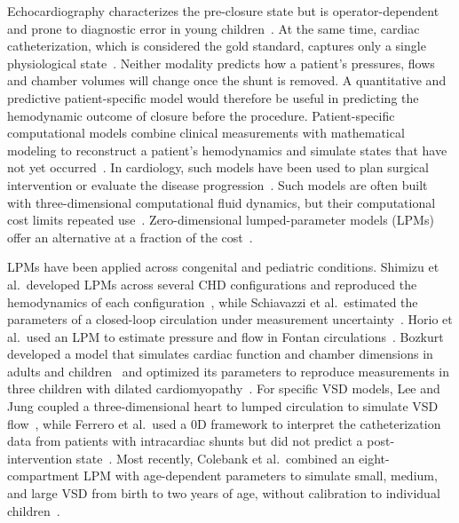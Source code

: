 \documentclass{article}
\begin{document}
Echocardiography characterizes the pre-closure state but is operator-dependent and prone to diagnostic error in young children~\cite{Benavidez2008}. At the same time, cardiac catheterization, which is considered the gold standard, captures only a single physiological state~\cite{Feltes2011}. Neither modality predicts how a patient's pressures, flows and chamber volumes will change once the shunt is removed. A quantitative and predictive patient-specific model would therefore be useful in predicting the hemodynamic outcome of closure before the procedure. Patient-specific computational models combine clinical measurements with mathematical modeling to reconstruct a patient's hemodynamics and simulate states that have not yet occurred~\cite{Taylor2009}. In cardiology, such models have been used to plan surgical intervention or evaluate the disease progression~\cite{Marsden2015,Pennati2013}. Such models are often built with three-dimensional computational fluid dynamics, but their computational cost limits repeated use~\cite{Pennati2013}. Zero-dimensional lumped-parameter models (LPMs) offer an alternative at a fraction of the cost~\cite{Shi2011}.

LPMs have been applied across congenital and pediatric conditions. Shimizu et al.\ developed LPMs across several CHD configurations and reproduced the hemodynamics of each configuration~\cite{Shimizu2018}, while Schiavazzi et al.\ estimated the parameters of a closed-loop circulation under measurement uncertainty~\cite{Schiavazzi2017}. Horio et al.\ used an LPM to estimate pressure and flow in Fontan circulations~\cite{Horio2024}. Bozkurt developed a model that simulates cardiac function and chamber dimensions in adults and children~\cite{Bozkurt2019} and optimized its parameters to reproduce measurements in three children with dilated cardiomyopathy~\cite{Bozkurt2022}. For specific VSD models, Lee and Jung coupled a three-dimensional heart to lumped circulation to simulate VSD flow~\cite{Lee2015}, while Ferrero et al.\ used a 0D framework to interpret the catheterization data from patients with intracardiac shunts but did not predict a post-intervention state~\cite{Ferrero2026Shunts}. Most recently, Colebank et al.\ combined an eight-compartment LPM with age-dependent parameters to simulate small, medium, and large VSD from birth to two years of age, without calibration to individual children~\cite{Colebank2026}.
\end{document}
